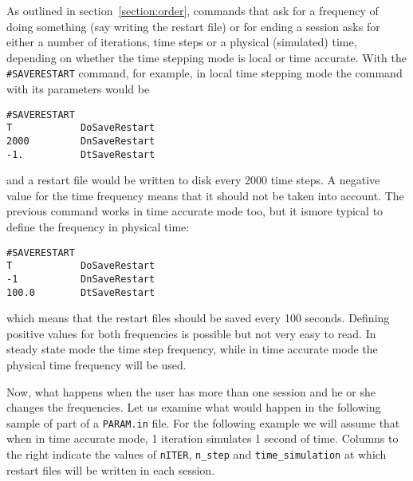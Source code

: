 As outlined in section~\ref{section:order}, commands that ask for a 
frequency of doing something (say 
writing the restart file) or for ending a session asks for either a number of
iterations, time steps or a physical (simulated) time, depending on 
whether the time
stepping mode is local or time accurate.
With the {\tt \#SAVERESTART} command, for example, in local time stepping mode
the command with its parameters would be
\begin{verbatim}
#SAVERESTART
T            DoSaveRestart
2000         DnSaveRestart
-1.          DtSaveRestart
\end{verbatim}
and a restart file would be written to disk every 2000 time steps. 
A negative value for the time frequency means that it should not be taken 
into account. The previous command works in time accurate mode too, 
but it ismore typical to define the frequency in physical time:
\begin{verbatim}
#SAVERESTART
T            DoSaveRestart
-1           DnSaveRestart
100.0        DtSaveRestart
\end{verbatim}
which means that the restart files should be saved every 100 seconds. 
Defining positive values for both frequencies is possible but not
very easy to read. In steady state mode the time step frequency, 
while in time accurate mode the physical time frequency will be used.

Now, what happens when the user has more than one session and he or she
changes the frequencies.  Let us examine what would happen in the following
sample of part of a {\tt PARAM.in} file.  For the following example we will
assume that when in time accurate mode, 1 iteration simulates 1 second of time.
Columns to the right indicate the values of {\tt nITER}, {\tt n\_step} and
{\tt time\_simulation} at which restart files will be written in each session.

\clearpage

